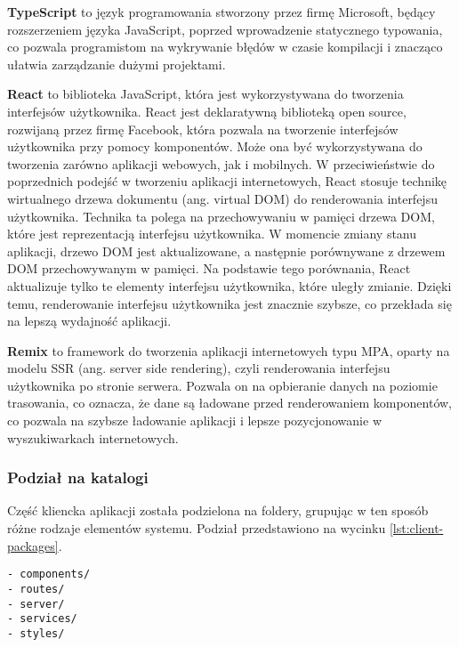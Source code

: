 \textbf{TypeScript} \cite{typescript} to język programowania stworzony przez firmę Microsoft, będący rozszerzeniem języka JavaScript, poprzed wprowadzenie statycznego typowania, co pozwala programistom na wykrywanie błędów w czasie kompilacji i znacząco ułatwia zarządzanie dużymi projektami. 

\textbf{React} \cite{react} to biblioteka JavaScript, która jest wykorzystywana do tworzenia interfejsów użytkownika. React jest deklaratywną biblioteką open source, rozwijaną przez firmę Facebook, która pozwala na tworzenie interfejsów użytkownika przy pomocy komponentów. Może ona być wykorzystywana do tworzenia zarówno aplikacji webowych, jak i mobilnych. W przeciwieństwie do poprzednich podejść w tworzeniu aplikacji internetowych, React stosuje technikę wirtualnego drzewa dokumentu (ang. virtual DOM) do renderowania interfejsu użytkownika. Technika ta polega na przechowywaniu w pamięci drzewa DOM, które jest reprezentacją interfejsu użytkownika. W momencie zmiany stanu aplikacji, drzewo DOM jest aktualizowane, a następnie porównywane z drzewem DOM przechowywanym w pamięci. Na podstawie tego porównania, React aktualizuje tylko te elementy interfejsu użytkownika, które uległy zmianie. Dzięki temu, renderowanie interfejsu użytkownika jest znacznie szybsze, co przekłada się na lepszą wydajność aplikacji.

\textbf{Remix} \cite{remix} to framework do tworzenia aplikacji internetowych typu MPA, oparty na modelu SSR (ang. server side rendering), czyli renderowania interfejsu użytkownika po stronie serwera. Pozwala on na opbieranie danych na poziomie trasowania, co oznacza, że dane są ładowane przed renderowaniem komponentów, co pozwala na szybsze ładowanie aplikacji i lepsze pozycjonowanie w wyszukiwarkach internetowych.

\subsubsection{Podział na katalogi}

Część kliencka aplikacji została podzielona na foldery, grupując w ten sposób różne rodzaje elementów systemu. Podział przedstawiono na wycinku \ref{lst:client-packages}.

\begin{lstlisting}[caption={Podział na foldery części klienckiej projektu},label={lst:client-packages},captionpos=b]
- components/
- routes/
- server/
- services/
- styles/
\end{lstlisting}

